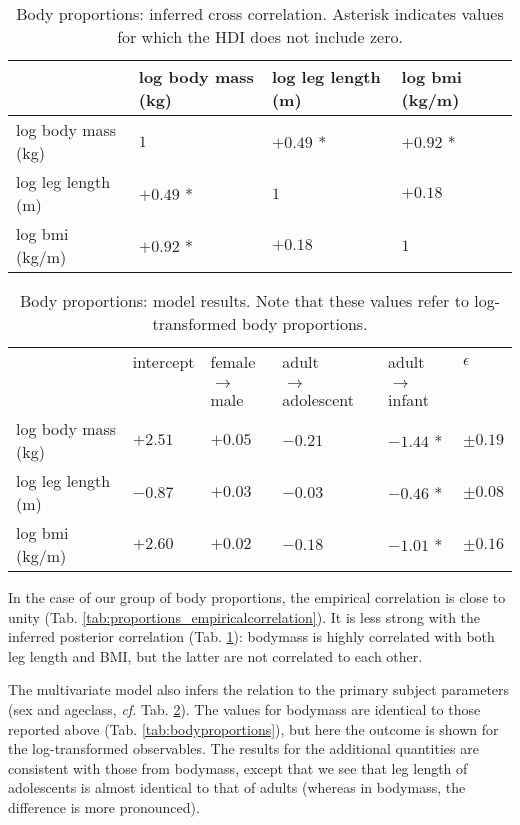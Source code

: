\begin{table}[p]
\caption{\label{tab:proportions_correlation}Body proportions: inferred cross correlation. Asterisk indicates values for which the HDI does not include zero.}
\centering
\begin{tabular}{l|lll}
 & log body mass (kg) & log leg length (m) & log bmi (kg/m)\\[0pt]
\hline
log body mass (kg) & \(1\) & \(+0.49\) * & \(+0.92\) *\\[0pt]
log leg length (m) & \(+0.49\) * & \(1\) & \(+0.18\)\\[0pt]
log bmi (kg/m) & \(+0.92\) * & \(+0.18\) & \(1\)\\[0pt]
\end{tabular}
\end{table}

\begin{table}[p]
\caption{\label{tab:proportions_predictors}Body proportions: model results. Note that these values refer to log-transformed body proportions. }
\centering
\begin{tabular}{|l|l|l|l|l|l|}
\hline
 & intercept & female  & adult  & adult  & \(\epsilon\)\\[0pt]
 & & \(\rightarrow\) male & \(\rightarrow\) adolescent & \(\rightarrow\) infant & \\[0pt]
\hline
log body mass (kg) & \(+2.51\) & \(+0.05\) & \(-0.21\) & \(-1.44\) * & \(\pm 0.19\)\\[0pt]
log leg length (m) & \(-0.87\) & \(+0.03\) & \(-0.03\) & \(-0.46\) * & \(\pm 0.08\)\\[0pt]
log bmi (kg/m) & \(+2.60\) & \(+0.02\) & \(-0.18\) & \(-1.01\) * & \(\pm 0.16\)\\[0pt]
\hline
\end{tabular}
\end{table}


In the case of our group of body proportions, the empirical correlation is close to unity (Tab. \ref{tab:proportions_empiricalcorrelation}).
It is less strong with the inferred posterior correlation (Tab. \ref{tab:proportions_correlation}): bodymass is highly correlated with both leg length and BMI, but the latter are not correlated to each other.


The multivariate model also infers the relation to the primary subject parameters (sex and ageclass, \emph{cf.} Tab. \ref{tab:proportions_predictors}).
The values for bodymass are identical to those reported above (Tab. \ref{tab:bodyproportions}), but here the outcome is shown for the log-transformed observables.
The results for the additional quantities are consistent with those from bodymass, except that we see that leg length of adolescents is almost identical to that of adults (whereas in bodymass, the difference is more pronounced).

